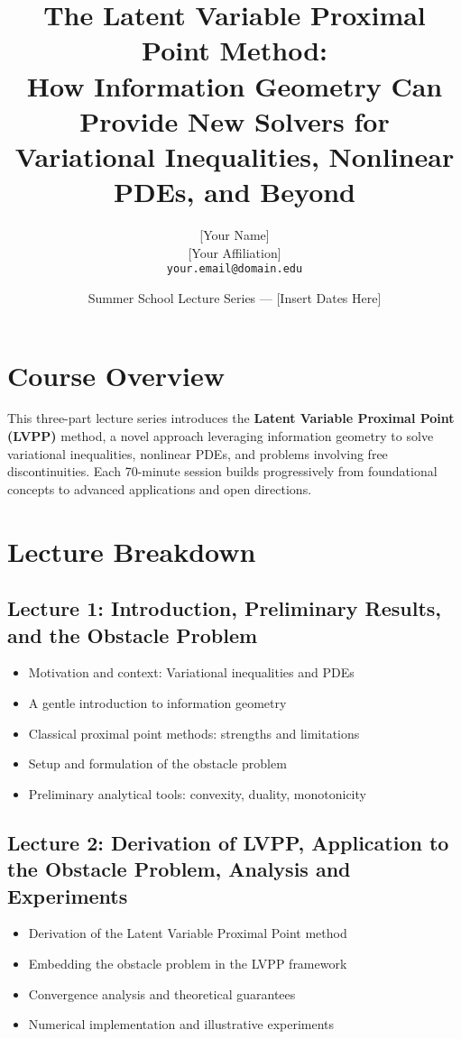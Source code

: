 \documentclass[11pt]{article}
\title{\textbf{The Latent Variable Proximal Point Method:\\ How Information Geometry Can Provide New Solvers for Variational Inequalities, Nonlinear PDEs, and Beyond}}
\author{[Your Name] \\ \small [Your Affiliation] \\ \small \texttt{your.email@domain.edu}}
\date{Summer School Lecture Series — [Insert Dates Here]}
\begin{document}
\maketitle

\section*{Course Overview}
This three-part lecture series introduces the \textbf{Latent Variable Proximal Point (LVPP)} method, a novel approach leveraging information geometry to solve variational inequalities, nonlinear PDEs, and problems involving free discontinuities. Each 70-minute session builds progressively from foundational concepts to advanced applications and open directions.

\section*{Lecture Breakdown}

\subsection*{Lecture 1: Introduction, Preliminary Results, and the Obstacle Problem}
\begin{itemize}[leftmargin=1.5em]
  \item Motivation and context: Variational inequalities and PDEs
  \item A gentle introduction to information geometry
  \item Classical proximal point methods: strengths and limitations
  \item Setup and formulation of the obstacle problem
  \item Preliminary analytical tools: convexity, duality, monotonicity
\end{itemize}

\subsection*{Lecture 2: Derivation of LVPP, Application to the Obstacle Problem, Analysis and Experiments}
\begin{itemize}[leftmargin=1.5em]
  \item Derivation of the Latent Variable Proximal Point method
  \item Embedding the obstacle problem in the LVPP framework
  \item Convergence analysis and theoretical guarantees
  \item Numerical implementation and illustrative experiments
\end{itemize}
\end{document}
